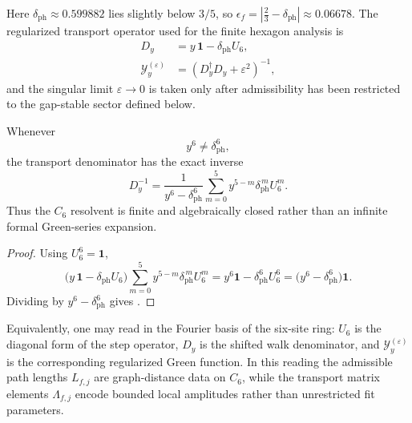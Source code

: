 Here $\delta_{\mathrm{ph}}\approx \num{0.599882}$ lies slightly below $3/5$, so $\epsilon_f=|\frac23-\delta_{\mathrm{ph}}|\approx \num{0.06678}$. The regularized transport operator used for the finite hexagon analysis is
\begin{equation}
\label{eq:yukawa-kernel}
\begin{aligned}
D_y&=y\,\mathbf 1-\delta_{\mathrm{ph}}U_6,\\
\mathcal Y_y^{(\varepsilon)}&=(D_y^\dagger D_y+\varepsilon^2)^{-1},
\end{aligned}
\end{equation}
and the singular limit $\varepsilon\to0$ is taken only after admissibility has been restricted to the gap-stable sector defined below.

\begin{proposition}
\label{prop:finite-hexagonal-resolvent}
Whenever
\[
y^6\neq \delta_{\mathrm{ph}}^6,
\]
the transport denominator has the exact inverse
\begin{equation}
\label{eq:finite-hexagonal-resolvent}
D_y^{-1}
=
\frac{1}{y^6-\delta_{\mathrm{ph}}^6}
\sum_{m=0}^{5}y^{5-m}\delta_{\mathrm{ph}}^{\,m}U_6^m.
\end{equation}
Thus the $C_6$ resolvent is finite and algebraically closed rather than an infinite formal Green-series expansion.
\end{proposition}

\begin{proof}
Using $U_6^6=\mathbf 1$,
\[
\bigl(y\,\mathbf 1-\delta_{\mathrm{ph}}U_6\bigr)
\sum_{m=0}^{5}y^{5-m}\delta_{\mathrm{ph}}^{\,m}U_6^m
=
y^6\mathbf 1-\delta_{\mathrm{ph}}^6U_6^6
=
\bigl(y^6-\delta_{\mathrm{ph}}^6\bigr)\mathbf 1.
\]
Dividing by $y^6-\delta_{\mathrm{ph}}^6$ gives .
\end{proof}

Equivalently, one may read  in the Fourier basis of the six-site ring: $U_6$ is the diagonal form of the step operator, $D_y$ is the shifted walk denominator, and $\mathcal Y_y^{(\varepsilon)}$ is the corresponding regularized Green function. In this reading the admissible path lengths $L_{f,j}$ are graph-distance data on $C_6$, while the transport matrix elements $\Lambda_{f,j}$ encode bounded local amplitudes rather than unrestricted fit parameters.

